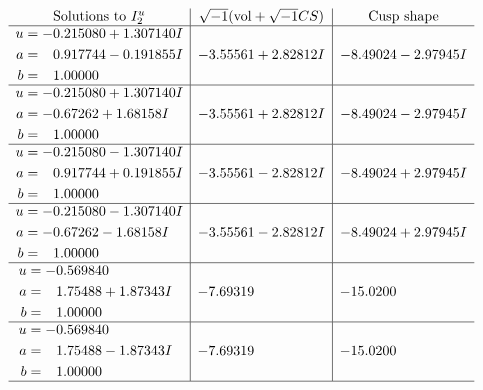 \documentclass[1p]{elsarticle_modified}
\theoremstyle{definition}
\newcommand{\I}{\sqrt{-1}}
\begin{document}
$$\begin{array}{c|c|c}  
\text{Solutions to }I^u_{2}& \I (\text{vol} + \sqrt{-1}CS) & \text{Cusp shape}\\
 \hline 
\begin{aligned}
u &= -0.215080 + 1.307140 I \\
a &= \phantom{-}0.917744 - 0.191855 I \\
b &= \phantom{-}1.00000\phantom{ +0.000000I}\end{aligned}
 & -3.55561 + 2.82812 I & -8.49024 - 2.97945 I \\ \hline\begin{aligned}
u &= -0.215080 + 1.307140 I \\
a &= -0.67262 + 1.68158 I \\
b &= \phantom{-}1.00000\phantom{ +0.000000I}\end{aligned}
 & -3.55561 + 2.82812 I & -8.49024 - 2.97945 I \\ \hline\begin{aligned}
u &= -0.215080 - 1.307140 I \\
a &= \phantom{-}0.917744 + 0.191855 I \\
b &= \phantom{-}1.00000\phantom{ +0.000000I}\end{aligned}
 & -3.55561 - 2.82812 I & -8.49024 + 2.97945 I \\ \hline\begin{aligned}
u &= -0.215080 - 1.307140 I \\
a &= -0.67262 - 1.68158 I \\
b &= \phantom{-}1.00000\phantom{ +0.000000I}\end{aligned}
 & -3.55561 - 2.82812 I & -8.49024 + 2.97945 I \\ \hline\begin{aligned}
u &= -0.569840\phantom{ +0.000000I} \\
a &= \phantom{-}1.75488 + 1.87343 I \\
b &= \phantom{-}1.00000\phantom{ +0.000000I}\end{aligned}
 & -7.69319\phantom{ +0.000000I} & -15.0200\phantom{ +0.000000I} \\ \hline\begin{aligned}
u &= -0.569840\phantom{ +0.000000I} \\
a &= \phantom{-}1.75488 - 1.87343 I \\
b &= \phantom{-}1.00000\phantom{ +0.000000I}\end{aligned}
 & -7.69319\phantom{ +0.000000I} & -15.0200\phantom{ +0.000000I}\\
 \hline 
 \end{array}$$\newpage\newpage\renewcommand{\arraystretch}{1}
\end{document}
